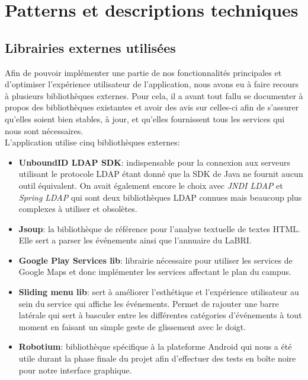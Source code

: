 \chapter{Patterns et descriptions techniques}

\section{Librairies externes utilisées}

Afin de pouvoir implémenter une partie de nos fonctionnalités principales et d'optimiser l'expérience utilisateur de l'application, nous avons eu à faire recours à plusieurs bibliothèques externes. Pour cela, il a avant tout fallu se documenter à propos des bibliothèques existantes et avoir des avis sur celles-ci afin de s'assurer qu'elles soient bien stables, à jour, et qu'elles fournissent tous les services qui nous sont nécessaires.\\

L'application utilise cinq bibliothèques externes: \\

\begin{itemize}
\renewcommand{\labelitemi}{$\bullet$}
\item \textbf{UnboundID LDAP SDK}: indispensable pour la connexion aux serveurs utilisant le protocole LDAP étant donné que la SDK de Java ne fournit aucun outil équivalent. On avait également encore le choix avec \textit{JNDI LDAP} et \textit{Spring LDAP} qui sont deux bibliothèques LDAP connues mais beaucoup plus complexes à utiliser et obsolètes. \\
\item \textbf{Jsoup}: la bibliothèque de référence pour l'analyse textuelle de textes HTML. Elle sert a parser les événements ainsi que l'annuaire du LaBRI. \\
\item \textbf{Google Play Services lib}: librairie nécessaire pour utiliser les services de Google Maps et donc implémenter les services affectant le plan du campus. \\
\item \textbf{Sliding menu lib}: sert à améliorer l'esthétique et l'expérience utilisateur au sein du service qui affiche les événements. Permet de rajouter une barre latérale qui sert à basculer entre les différentes catégories d'événements à tout moment en faisant un simple geste de glissement avec le doigt. \\
\item \textbf{Robotium}: bibliothèque spécifique à la plateforme Android qui nous a été utile durant la phase finale du projet afin d'effectuer des tests en boîte noire pour notre interface graphique. 
\end{itemize}

